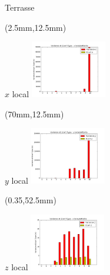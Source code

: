 \documentclass[10pt]{beamer}
\begin{document}
	\begin{frame}{Terrasse}
		\begin{textblock*}{60mm}(2.5mm,12.5mm)
			\begin{block}{$x$ local}
				\includegraphics[width=125px]{../src/data/itinary_2/var_ecart_sat_x2.png}
			\end{block}
		\end{textblock*}

		\begin{textblock*}{60mm}(70mm,12.5mm)
			\begin{block}{$y$ local}
				\includegraphics[width=125px]{../src/data/itinary_2/var_ecart_sat_y2.png}
			\end{block}
		\end{textblock*}

		\begin{textblock*}{60mm}(0.35\textwidth,52.5mm)
			\begin{block}{$z$ local}
				\includegraphics[width=125px]{../src/data/itinary_2/var_ecart_sat_z2.png}
			\end{block}
		\end{textblock*}
	\end{frame}
\end{document}
